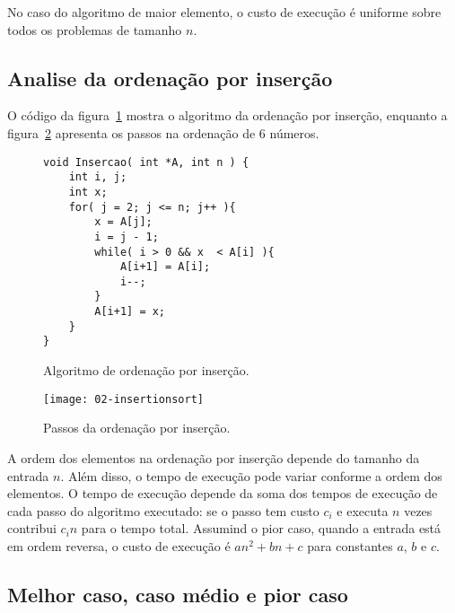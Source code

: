 No caso do algoritmo de maior elemento, o custo de execução é uniforme sobre todos os problemas 
de tamanho $n$.

\subsection{Analise da ordenação por inserção}

O código da figura~\ref{aula02:algo:insertion} mostra o algoritmo da ordenação
por inserção, enquanto a figura~\ref{aula02:fig:insertion} apresenta os passos
na ordenação de 6 números.
%
\begin{figure}[!htb]
\centering
\begin{framed}
\begin{lstlisting}
void Insercao( int *A, int n ) {
	int i, j;
	int x;
	for( j = 2; j <= n; j++ ){
		x = A[j];
		i = j - 1;
		while( i > 0 && x  < A[i] ){
			A[i+1] = A[i];
			i--;
		}
		A[i+1] = x;
	}
}
\end{lstlisting}
\end{framed}
\caption{Algoritmo de ordenação por inserção.}
\label{aula02:algo:insertion}
\end{figure}
%
\begin{figure}[ht]
\centering
\texttt{[image: 02-insertionsort]}
\caption{Passos da ordenação por inserção.}
\label{aula02:fig:insertion}
\end{figure}

A ordem dos elementos na ordenação por inserção depende do tamanho da entrada $n$. 
Além disso, o tempo de execução pode variar conforme a ordem dos elementos.
%
O tempo de execução depende da soma dos tempos de execução de cada passo do algoritmo
executado: se o passo tem custo $c_i$ e executa $n$ vezes contribui $c_i n$ para o tempo
total.
Assumind o pior caso, quando a entrada está em ordem reversa, o custo de execução é 
$an^2 + bn +c$ para constantes $a$, $b$ e $c$.


\subsection{Melhor caso, caso médio e pior caso}

